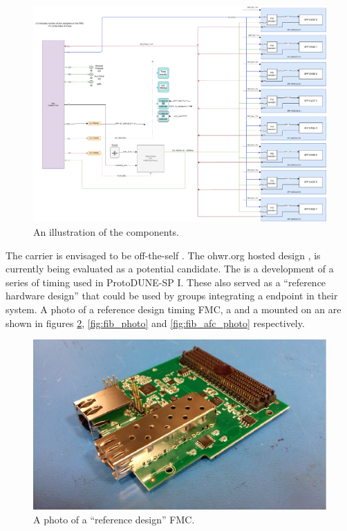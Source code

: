 \documentclass[main.tex]{subfiles}
\begin{document}
\begin{figure}[h]
\includegraphics[width=\textwidth]{dune_fib_v2_pc072a.drawio.pdf}
\caption{An illustration of the  components.}
\label{fig:fib_and_carrier_layout}
\end{figure}

The  carrier is envisaged to be off-the-self . The ohwr.org hosted  design \cite{amc_ohwr}, is currently being evaluated as a potential candidate. The  is a development of a series of timing  used in ProtoDUNE-SP I. These  also served as a ``reference hardware design'' that could be used by groups integrating a  endpoint in their system. A photo of a reference design timing FMC, a  and a  mounted on an  are shown in figures \ref{fig:timing_fmc}, \ref{fig:fib_photo} and \ref{fig:fib_afc_photo} respectively.

\begin{figure}[h]
\includegraphics[width=\textwidth]{timing_fmc.pdf}
\caption{A photo of a ``reference design'' FMC.}
\label{fig:timing_fmc}
\end{figure}
\end{document}
